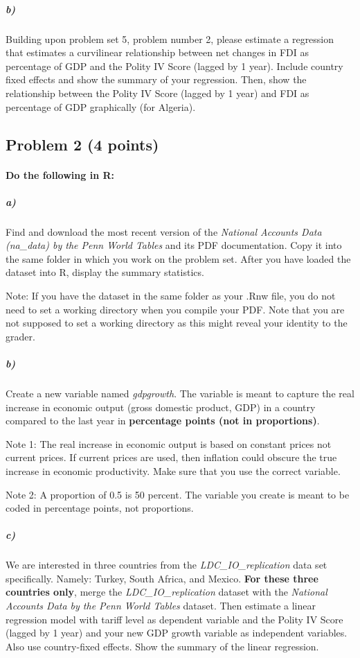 \documentclass[12pt]{article}
\begin{document}
\subparagraph{b)} Building upon problem set 5, problem number 2, please estimate a regression that estimates a curvilinear relationship between net changes in FDI as percentage of GDP and the Polity IV Score (lagged by 1 year). Include country fixed effects and show the summary of your regression. Then, show the relationship between the Polity IV Score (lagged by 1 year) and FDI as percentage of GDP graphically (for Algeria).



\subsection*{Problem 2 (4 points)}

\paragraph{Do the following in R:}

\subparagraph{a)} Find and download the most recent version of the \textit{National Accounts Data (na\_data) by the Penn World Tables} and its PDF documentation. Copy it into the same folder in which you work on the problem set. After you have loaded the dataset into R, display the summary statistics.

Note: If you have the dataset in the same folder as your .Rnw file, you do not need to set a working directory when you compile your PDF. Note that you are not supposed to set a working directory as this might reveal your identity to the grader.

\subparagraph{b)} Create a new variable named \textit{gdpgrowth}. The variable is meant to capture the real increase in economic output (gross domestic product, GDP) in a country compared to the last year in \textbf{percentage points (not in proportions)}.

Note 1: The real increase in economic output is based on constant prices not current prices. If current prices are used, then inflation could obscure the true increase in economic productivity. Make sure that you use the correct variable.

Note 2: A proportion of 0.5 is 50 percent. The variable you create is meant to be coded in percentage points, not proportions.

\subparagraph{c)} We are interested in three countries from the \textit{LDC\_IO\_replication} data set specifically. Namely: Turkey, South Africa, and Mexico. \textbf{For these three countries only}, merge the \textit{LDC\_IO\_replication} dataset with the \textit{National Accounts Data by the Penn World Tables} dataset. Then estimate a linear regression model with tariff level as dependent variable and the Polity IV Score (lagged by 1 year) and your new GDP growth variable as independent variables. Also use country-fixed effects. Show the summary of the linear regression.
\end{document}
